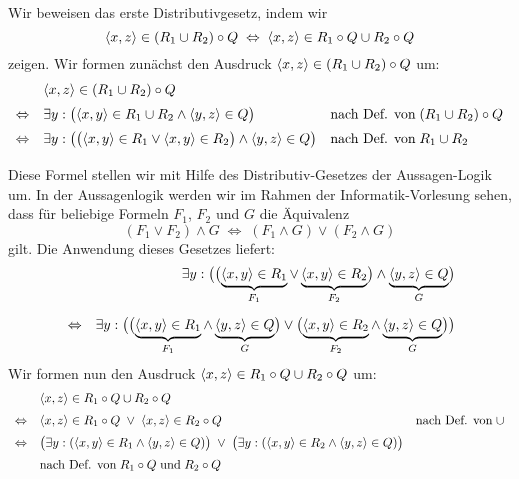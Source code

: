 \proof
Wir beweisen  das erste Distributivgesetz, indem wir 
\begin{equation}
  \label{eq:dis0}
\pair(x,z) \in (R_1 \cup R_2) \circ Q \;\Leftrightarrow\; \pair(x,z) \in R_1 \circ Q \cup R_2 \circ Q   
\end{equation}
zeigen.  Wir formen zun\"{a}chst den Ausdruck $\pair(x,z) \in (R_1 \cup R_2) \circ Q$ um:
\[
\begin{array}{cll}
                  & \pair(x,z) \in (R_1 \cup R_2) \circ Q  \\[0.2cm]
  \Leftrightarrow & \exists y: \bigl(\pair(x,y) \in R_1 \cup R_2 \wedge \pair(y,z) \in Q\bigr) 
                  & \mbox{nach Def. von}\; (R_1 \cup R_2) \circ Q \\[0.2cm]
  \Leftrightarrow & \exists y: \bigl(\bigl(\pair(x,y) \in R_1 \vee \pair(x,y) \in R_2\bigr) \wedge \pair(y,z) \in Q\bigr) 
                  & \mbox{nach Def. von}\; R_1 \cup R_2 \\[0.2cm]
\end{array}
\]
Diese Formel stellen wir mit Hilfe des Distributiv-Gesetzes der Aussagen-Logik um.
In der Aussagenlogik werden wir im Rahmen der Informatik-Vorlesung sehen, dass f\"{u}r beliebige Formeln
$F_1$, $F_2$ und $G$ die \"{A}quivalenz 
\[ (F_1 \vee F_2) \wedge G \;\Leftrightarrow\; (F_1 \wedge G) \vee (F_2 \wedge G) \]
gilt.  Die Anwendung dieses Gesetzes liefert:
\begin{eqnarray}
  \nonumber
  & & \exists y: \bigl(\bigl(\underbrace{\pair(x,y) \in R_1}_{F_1} \vee \underbrace{\pair(x,y) \in R_2}_{F_2}\bigr) \wedge \underbrace{\pair(y,z) \in Q}_G\bigr) 
\\[0.2cm] 
  \label{eq:dis1}
  & \Leftrightarrow &
    \exists y: \bigl(\bigl(\underbrace{\pair(x,y) \in R_1}_{F_1} \wedge \underbrace{\pair(y,z) \in Q}_G \bigr) \vee 
               \bigl(\underbrace{\pair(x,y) \in R_2}_{F_2} \wedge \underbrace{\pair(y,z) \in Q}_G \bigr) \bigr)   
\end{eqnarray}
Wir formen nun den Ausdruck $\pair(x,z) \in R_1 \circ Q \cup R_2 \circ Q$ um:
\[
\begin{array}{cll}
                & \pair(x,z) \in R_1 \circ Q \cup R_2 \circ Q \\[0.2cm]
\Leftrightarrow & \pair(x,z) \in R_1 \circ Q \;\vee\; \pair(x,z) \in R_2 \circ Q &
                  \mbox{nach Def. von}\;\cup \\[0.2cm]
\Leftrightarrow & \bigl(\exists y: (\pair(x,y) \in R_1 \wedge \pair(y,z) \in Q)\bigr) \;\vee\; 
                  \bigl(\exists y: (\pair(x,y) \in R_2 \wedge \pair(y,z) \in Q)\bigr) \\[0.2cm]
                & \mbox{nach Def. von}\; R_1 \circ Q \; \mbox{und}\; R_2 \circ Q \\[0.2cm]
\end{array}
\]
